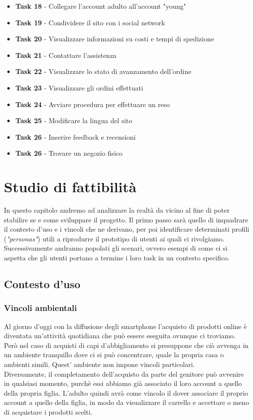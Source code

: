 \documentclass[12pt,a4paper]{report}
\begin{document}
\begin{itemize}
  \item \textbf{Task 18} - Collegare l'account adulto all'account "young"
  \item \textbf{Task 19} - Condividere il sito con i social network
  \item \textbf{Task 20} - Visualizzare informazioni su costi e tempi di spedizione
  \item \textbf{Task 21} - Contattare l'assistenza
  \item \textbf{Task 22} - Visualizzare lo stato di avanzamento dell'ordine
  \item \textbf{Task 23} - Visualizzare gli ordini effettuati
  \item \textbf{Task 24} - Avviare procedura per effettuare un reso
  \item \textbf{Task 25} - Modificare la lingua del sito
  \item \textbf{Task 26} - Inserire feedback e recensioni
  \item \textbf{Task 26} - Trovare un negozio fisico

\end{itemize}
\chapter{Studio di fattibilità}
In questo capitolo andremo ad analizzare la realtà da vicino al fine di poter stabilire se e come sviluppare il progetto. Il primo passo sarà quello di inquadrare il contesto d'uso e i vincoli che ne derivano, per poi identificare determinati profili (\textit{"personas"}) utili a riprodurre il prototipo di utenti ai quali ci rivolgiamo. Successivamente andranno popolati gli scenari, ovvero esempi di come ci si aspetta che gli utenti portano a termine i loro task in un contesto specifico.
\section{Contesto d'uso}
\subsection{Vincoli ambientali}
Al giorno d'oggi con la diffusione degli smartphone l'acquisto di prodotti online è diventata un'attività quotidiana che può essere eseguita ovunque ci troviamo. Però nel caso di acquisti di capi d'abbigliamento si presuppone che ciò avvenga in un ambiente tranquillo dove ci si può concentrare, quale la propria casa o ambienti simili. Quest' ambiente non impone vincoli particolari.\\
Diversamente, il completamento dell'acquisto da parte del genitore può avvenire in qualsiasi momento, purchè essi abbiamo già associato il loro account a quello della propria figlia. L'adulto quindi avrà come vincolo il dover associare il proprio account a quello della figlia, in modo da visualizzare il carrello e accettare o meno di acquistare i prodotti scelti.
\end{document}
